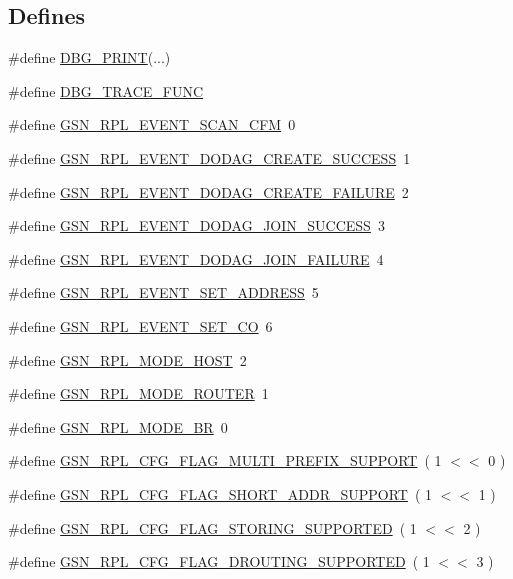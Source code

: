 \subsection*{Defines}
\begin{DoxyCompactItemize}
\item 
\#define \hyperlink{a00579_a76520932a9de1d3ad79aa033570ff22d}{DBG\_\-PRINT}(...)
\item 
\#define \hyperlink{a00579_a1c880916c8bd4828a6d0bcb453ad12cf}{DBG\_\-TRACE\_\-FUNC}
\item 
\#define \hyperlink{a00579_aa2a1d50f3122f531a181d4b8f06f1a94}{GSN\_\-RPL\_\-EVENT\_\-SCAN\_\-CFM}~0
\item 
\#define \hyperlink{a00579_abba7caf36f9aea873bd3c05cbfe288ca}{GSN\_\-RPL\_\-EVENT\_\-DODAG\_\-CREATE\_\-SUCCESS}~1
\item 
\#define \hyperlink{a00579_a8d304fa5ca5832f6f72a6fdc3801db94}{GSN\_\-RPL\_\-EVENT\_\-DODAG\_\-CREATE\_\-FAILURE}~2
\item 
\#define \hyperlink{a00579_a3d38dddaad3b225a7c7c6ba7afec1037}{GSN\_\-RPL\_\-EVENT\_\-DODAG\_\-JOIN\_\-SUCCESS}~3
\item 
\#define \hyperlink{a00579_a4e4ef253d76f5a47b1ecc116b1097ef4}{GSN\_\-RPL\_\-EVENT\_\-DODAG\_\-JOIN\_\-FAILURE}~4
\item 
\#define \hyperlink{a00579_af5574a96e9702824c5a537085b3c8cce}{GSN\_\-RPL\_\-EVENT\_\-SET\_\-ADDRESS}~5
\item 
\#define \hyperlink{a00579_a0911a69569ce8084040d5a7858cf805c}{GSN\_\-RPL\_\-EVENT\_\-SET\_\-CO}~6
\item 
\#define \hyperlink{a00579_abbc9f7466e7b1bb3933f985f83527a2a}{GSN\_\-RPL\_\-MODE\_\-HOST}~2
\item 
\#define \hyperlink{a00579_a384e139c7ef24432a4d438ba9424379d}{GSN\_\-RPL\_\-MODE\_\-ROUTER}~1
\item 
\#define \hyperlink{a00579_a48f959880ea8283379ed591e3599c6bc}{GSN\_\-RPL\_\-MODE\_\-BR}~0
\item 
\#define \hyperlink{a00579_aaf2663a2e0bea4d734cc7b884ca2ceca}{GSN\_\-RPL\_\-CFG\_\-FLAG\_\-MULTI\_\-PREFIX\_\-SUPPORT}~( 1 $<$$<$ 0 )
\item 
\#define \hyperlink{a00579_aedf2d3bed2620ffc71c969a4170a71a2}{GSN\_\-RPL\_\-CFG\_\-FLAG\_\-SHORT\_\-ADDR\_\-SUPPORT}~( 1 $<$$<$ 1 )
\item 
\#define \hyperlink{a00579_a8750ae8a007ad0ca59ed3cceda625bae}{GSN\_\-RPL\_\-CFG\_\-FLAG\_\-STORING\_\-SUPPORTED}~( 1 $<$$<$ 2 )
\item 
\#define \hyperlink{a00579_ad496c900f1dd56b8c592f8e0432c2f88}{GSN\_\-RPL\_\-CFG\_\-FLAG\_\-DROUTING\_\-SUPPORTED}~( 1 $<$$<$ 3 )
\end{DoxyCompactItemize}
